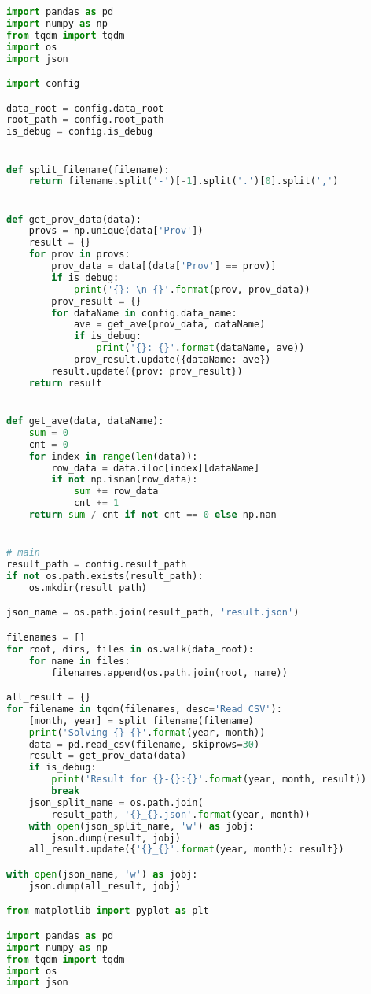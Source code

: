 \documentclass[bwprint]{gmcmthesis}
\begin{document}
\begin{lstlisting}[language=Python]
import pandas as pd
import numpy as np
from tqdm import tqdm
import os
import json

import config

data_root = config.data_root
root_path = config.root_path
is_debug = config.is_debug


def split_filename(filename):
    return filename.split('-')[-1].split('.')[0].split(',')


def get_prov_data(data):
    provs = np.unique(data['Prov'])
    result = {}
    for prov in provs:
        prov_data = data[(data['Prov'] == prov)]
        if is_debug:
            print('{}: \n {}'.format(prov, prov_data))
        prov_result = {}
        for dataName in config.data_name:
            ave = get_ave(prov_data, dataName)
            if is_debug:
                print('{}: {}'.format(dataName, ave))
            prov_result.update({dataName: ave})
        result.update({prov: prov_result})
    return result


def get_ave(data, dataName):
    sum = 0
    cnt = 0
    for index in range(len(data)):
        row_data = data.iloc[index][dataName]
        if not np.isnan(row_data):
            sum += row_data
            cnt += 1
    return sum / cnt if not cnt == 0 else np.nan


# main
result_path = config.result_path
if not os.path.exists(result_path):
    os.mkdir(result_path)

json_name = os.path.join(result_path, 'result.json')

filenames = []
for root, dirs, files in os.walk(data_root):
    for name in files:
        filenames.append(os.path.join(root, name))

all_result = {}
for filename in tqdm(filenames, desc='Read CSV'):
    [month, year] = split_filename(filename)
    print('Solving {} {}'.format(year, month))
    data = pd.read_csv(filename, skiprows=30)
    result = get_prov_data(data)
    if is_debug:
        print('Result for {}-{}:{}'.format(year, month, result))
        break
    json_split_name = os.path.join(
        result_path, '{}_{}.json'.format(year, month))
    with open(json_split_name, 'w') as jobj:
        json.dump(result, jobj)
    all_result.update({'{}_{}'.format(year, month): result})

with open(json_name, 'w') as jobj:
    json.dump(all_result, jobj)

from matplotlib import pyplot as plt

import pandas as pd
import numpy as np
from tqdm import tqdm
import os
import json


\end{lstlisting}
\end{document}
